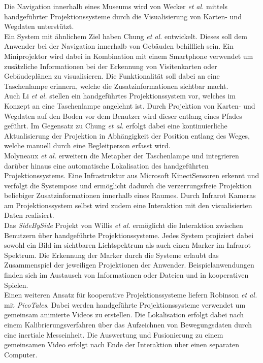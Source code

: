 Die Navigation innerhalb eines Museums wird von Wecker \textit{et al.} \cite{Wecker2013} mittels handgeführter Projektionssysteme durch die Visualisierung von Karten- und Wegdaten unterstützt.\\
Ein System mit ähnlichem Ziel haben Chung \textit{et al.} \cite{Chung2011} entwickelt. Dieses soll dem Anwender bei der Navigation innerhalb von Gebäuden behilflich sein. Ein Miniprojektor wird dabei in Kombination mit einem Smartphone verwendet um zusätzliche Informationen bei der Erkennung von Visitenkarten oder Gebäudeplänen zu visualisieren. Die Funktionalität soll dabei an eine Taschenlampe erinnern, welche die Zusatzinformationen sichtbar macht.\\
Auch Li \textit{et al.} \cite{Li2013} stellen ein handgeführtes Projektionssystem vor, welches im Konzept an eine Taschenlampe angelehnt ist. Durch Projektion von Karten- und Wegdaten auf den Boden vor dem Benutzer wird dieser entlang eines Pfades geführt. Im Gegensatz zu Chung \textit{et al.} erfolgt dabei eine kontinuierliche Aktualisierung der Projektion in Abhängigkeit der Position entlang des Weges, welche manuell durch eine Begleitperson erfasst wird.\\
Molyneaux \textit{et al.} \cite{Molyneaux2012} erweitern die Metapher der Taschenlampe und integrieren darüber hinaus eine automatische Lokalisation des handgeführten Projektionssystems. Eine Infrastruktur aus Microsoft Kinect\red[TM] Sensoren erkennt und verfolgt die Systempose und ermöglicht dadurch die verzerrungsfreie Projektion beliebiger Zusatzinformationen innerhalb eines Raumes. Durch Infrarot Kameras am Projektionssystem selbst wird zudem eine Interaktion mit den visualisierten Daten realisiert.\\

Das \textit{SideBySide} Projekt von Willis \textit{et al.} \cite{Willis2011} ermöglicht die Interaktion zwischen Benutzern über handgeführte Projektionssysteme. Jedes System projiziert dabei sowohl ein Bild im sichtbaren Lichtspektrum als auch einen Marker im Infrarot Spektrum. Die Erkennung der Marker durch die Systeme erlaubt das Zusammenspiel der jeweiligen Projektionen der Anwender. Beispielanwendungen finden sich im Austausch von Informationen oder Dateien und in kooperativen Spielen.\\
Einen weiteren Ansatz für kooperative Projektionssysteme liefern Robinson \textit{et al.} \cite{Robinson2012} mit \textit{PicoTales}. Dabei werden handgeführte Projektionssysteme verwendet um gemeinsam animierte Videos zu erstellen. Die Lokalisation erfolgt dabei nach einem Kalibrierungsverfahren über das Aufzeichnen von Bewegungsdaten durch eine inertiale Messeinheit. Die Auswertung und Fusionierung zu einem gemeinsamen Video erfolgt nach Ende der Interaktion über einen separaten Computer.\\

